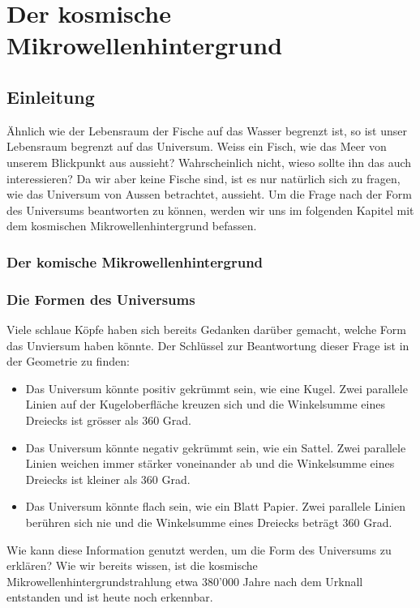 
	\chapter{Der kosmische Mikrowellenhintergrund\label{chapter:thema}}
	\begin{refsection}
		
		\printbibliography[heading=subbibliography]
	\end{refsection}
	\section{Einleitung}
	Ähnlich wie der Lebensraum der Fische auf das Wasser begrenzt ist, so ist unser Lebensraum begrenzt auf das Universum.
	Weiss ein Fisch, wie das Meer von unserem Blickpunkt aus aussieht?
	Wahrscheinlich nicht, wieso sollte ihn das auch interessieren?
	Da wir aber keine Fische sind, ist es nur natürlich sich zu fragen, wie das Universum von Aussen betrachtet, aussieht.
	Um die Frage nach der Form des Universums beantworten zu können, werden wir uns im folgenden Kapitel mit dem kosmischen Mikrowellenhintergrund befassen.
	\subsection{Der komische Mikrowellenhintergrund}
	
	\subsection{Die Formen des Universums}
	Viele schlaue Köpfe haben sich bereits Gedanken darüber gemacht, welche Form das Unviersum haben könnte. Der Schlüssel zur Beantwortung dieser Frage ist in der Geometrie zu finden:
	\begin{itemize}
		\item Das Universum könnte positiv gekrümmt sein, wie eine Kugel.
		Zwei parallele Linien auf der Kugeloberfläche kreuzen sich und die Winkelsumme eines Dreiecks ist grösser als 360 Grad.
		\item Das Universum könnte negativ gekrümmt sein, wie ein Sattel.
		Zwei parallele Linien weichen immer stärker voneinander ab und die Winkelsumme eines Dreiecks ist kleiner als 360 Grad.
		\item Das Universum könnte flach sein, wie ein Blatt Papier.
		Zwei parallele Linien berühren sich nie und die Winkelsumme eines Dreiecks beträgt 360 Grad.
	\end{itemize}
	Wie kann diese Information genutzt werden, um die Form des Universums zu erklären?
	Wie wir bereits wissen, ist die kosmische Mikrowellenhintergrundstrahlung etwa 380'000 Jahre nach dem Urknall entstanden und ist heute noch erkennbar. 
	

